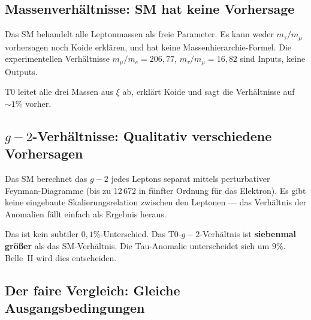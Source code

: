 \subsection{Massenverhältnisse: SM hat keine Vorhersage}

Das SM behandelt alle Leptonmassen als freie Parameter. Es kann weder $m_\tau/m_\mu$ vorhersagen noch Koide erklären, und hat keine Massenhierarchie-Formel. Die experimentellen Verhältnisse $m_\mu/m_e = 206{,}77$, $m_\tau/m_\mu = 16{,}82$ sind Inputs, keine Outputs.

T0 leitet alle drei Massen aus $\xi$ ab, erklärt Koide und sagt die Verhältnisse auf $\sim 1\%$ vorher.

\subsection{$g-2$-Verhältnisse: Qualitativ verschiedene Vorhersagen}

Das SM berechnet das $g-2$ jedes Leptons separat mittels perturbativer Feynman-Diagramme (bis zu 12\,672 in fünfter Ordnung für das Elektron). Es gibt keine eingebaute Skalierungsrelation zwischen den Leptonen — das Verhältnis der Anomalien fällt einfach als Ergebnis heraus.

\begin{table}[h]
	\centering
	\caption{T0 vs SM: $g-2$-Verhältnisvorhersagen für das Tau-Lepton}
	\label{tab:g2comparison}
\end{table}

Das ist kein subtiler $0{,}1\%$-Unterschied. Das T0-$g-2$-Verhältnis ist \textbf{siebenmal größer} als das SM-Verhältnis. Die Tau-Anomalie unterscheidet sich um $9\%$. Belle~II wird dies entscheiden.

\subsection{Der faire Vergleich: Gleiche Ausgangsbedingungen}

